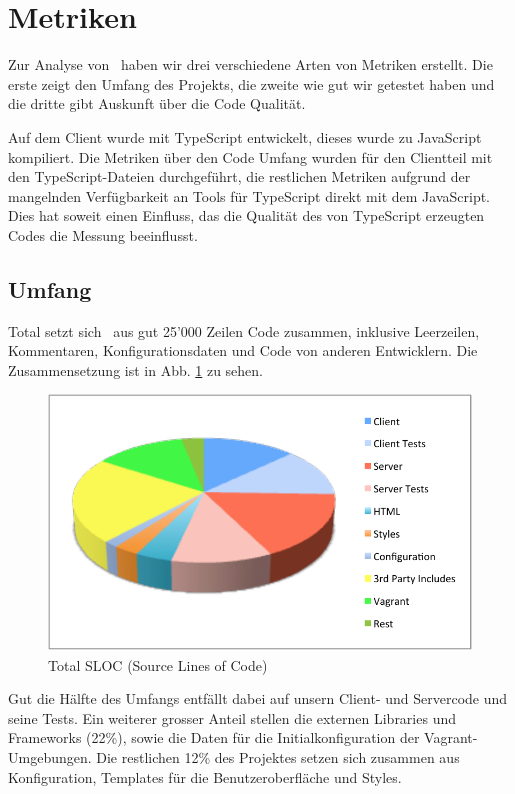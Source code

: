 \section{Metriken}
	Zur Analyse von \eeppi\ haben wir drei verschiedene Arten von Metriken erstellt.
	Die erste zeigt den Umfang des Projekts,
	die zweite wie gut wir getestet haben
	und die dritte gibt Auskunft über die Code Qualität.
	
	Auf dem Client wurde mit TypeScript entwickelt, dieses wurde zu JavaScript kompiliert.
	Die Metriken über den Code Umfang wurden für den Clientteil mit den TypeScript-Dateien durchgeführt,
	die restlichen Metriken aufgrund der mangelnden Verfügbarkeit an Tools für TypeScript direkt mit dem JavaScript.
	Dies hat soweit einen Einfluss, das die Qualität des von TypeScript erzeugten Codes die Messung beeinflusst.
	
	\subsection{Umfang}
	Total setzt sich \eeppi\ aus gut 25'000 Zeilen Code zusammen, inklusive Leerzeilen, Kommentaren, Konfigurationsdaten und Code von anderen Entwicklern.
	Die Zusammensetzung ist in Abb. \ref{fig:TotalSLOC} zu sehen.
	\begin{figure}[H]
		\includegraphics[width=\largeThird\textwidth]{projectPlan/media/img/totalSLOC.pdf}
		\centering
		\caption{Total SLOC (Source Lines of Code)}
		\label{fig:TotalSLOC}
	\end{figure}
	
	Gut die Hälfte des Umfangs entfällt dabei auf unsern Client- und Servercode und seine Tests.
	Ein weiterer grosser Anteil stellen die externen Libraries und Frameworks (22\%),
	sowie die Daten für die Initialkonfiguration der Vagrant-Umgebungen.
	Die restlichen 12\% des Projektes setzen sich zusammen aus Konfiguration, Templates für die Benutzeroberfläche und Styles.
	

